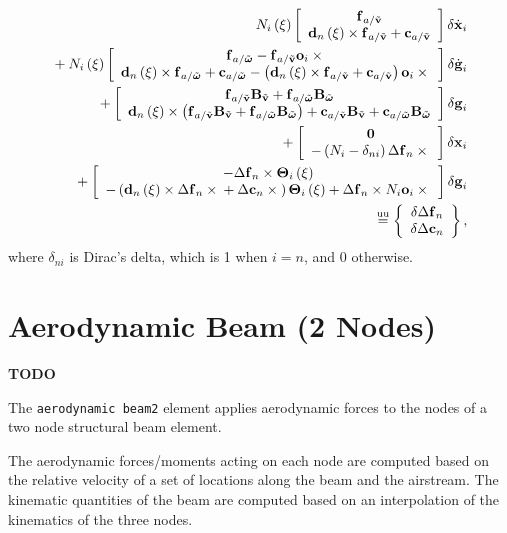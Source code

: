 \begin{align}
	N_i\plbr{\xi} \sqbr{\matr{c}{
		\T{f}_{a/\tilde{\T{v}}} \\
		\T{d}_n\plbr{\xi} \times \T{f}_{a/\tilde{\T{v}}}
		+ \T{c}_{a/\tilde{\T{v}}}
	}} \delta\dot{\T{x}}_i
	\nonumber \\
%
	\mbox{}
	+ N_i\plbr{\xi} \sqbr{\matr{c}{
		\T{f}_{a/\tilde{\T{\omega}}}
		- \T{f}_{a/\tilde{\T{v}}} \T{o}_i \times{} \\
		\T{d}_n\plbr{\xi} \times \T{f}_{a/\tilde{\T{\omega}}}
		+ \T{c}_{a/\tilde{\T{\omega}}}
		- \plbr{
			\T{d}_n\plbr{\xi} \times \T{f}_{a/\tilde{\T{v}}}
			+ \T{c}_{a/\tilde{\T{v}}}
		} \T{o}_i \times{}
	}} \delta\dot{\T{g}}_i
	\nonumber \\
%
	\mbox{}
	+ \sqbr{\matr{c}{
		\T{f}_{a/\tilde{\T{v}}} \TT{B}_{\tilde{\T{v}}}
			+ \T{f}_{a/\tilde{\T{\omega}}} \TT{B}_{\tilde{\T{\omega}}} \\
		\T{d}_n\plbr{\xi} \times \plbr{
			\T{f}_{a/\tilde{\T{v}}} \TT{B}_{\tilde{\T{v}}}
				+ \T{f}_{a/\tilde{\T{\omega}}} \TT{B}_{\tilde{\T{\omega}}}
		}
		+ \T{c}_{a/\tilde{\T{v}}} \TT{B}_{\tilde{\T{v}}}
			+ \T{c}_{a/\tilde{\T{\omega}}} \TT{B}_{\tilde{\T{\omega}}}
	}} \delta\T{g}_i
	\nonumber \\
%
	\mbox{}
	+ \sqbr{\matr{c}{
		\TT{0} \\
		- \plbr{
			N_i - \delta_{ni}
		} \Delta\T{f}_n \times{}
	}} \delta\T{x}_i
	\nonumber \\
%
	\mbox{}
	+ \sqbr{\matr{c}{
		- \Delta\T{f}_n \times \TT{\Theta}_i\plbr{\xi} \\
		- \plbr{
			\T{d}_n\plbr{\xi} \times \Delta\T{f}_n \times{}
			+ \Delta\T{c}_n \times{}
		} \TT{\Theta}_i\plbr{\xi}
		+ \Delta\T{f}_n \times N_i \T{o}_i \times{}
	}} \delta\T{g}_i
	\nonumber \\
%
	\equu
	\cubr{\cvvect{
		\delta\Delta\T{f}_n \\
		\delta\Delta\T{c}_n
	}}
	,
\end{align}
where $\delta_{ni}$ is Dirac's delta, which is 1 when $i=n$, and 0 otherwise.




\section{Aerodynamic Beam (2 Nodes)}
\textbf{TODO}

The \texttt{aerodynamic beam2} element applies aerodynamic forces
to the nodes of a two node structural beam element. 

The aerodynamic forces/moments acting on each node 
are computed based on the relative velocity of a set of locations
along the beam and the airstream.
The kinematic quantities of the beam are computed based
on an interpolation of the kinematics of the three nodes.

